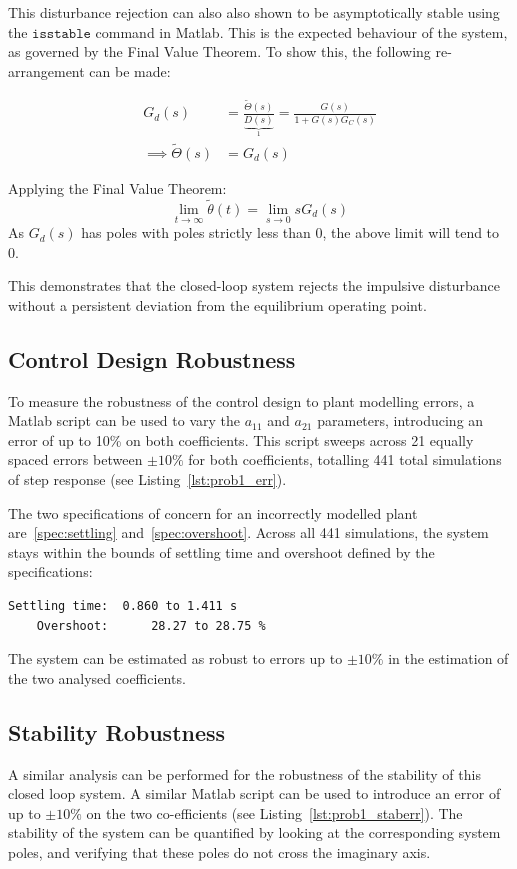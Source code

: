 \documentclass[conference,onecolumn,a4paper,11pt]{IEEEtran}
\begin{document}
This disturbance rejection can also also shown to be asymptotically stable using the $\texttt{isstable}$ command in Matlab. This is the expected behaviour of the system, as governed by the Final Value Theorem. To show this, the following re-arrangement can be made:

\begin{align*}
    G_d(s) &= \frac{\tilde{\Theta}(s)}{\underbrace{D(s)}_{1}} = \frac{G(s)}{1+G(s)G_C(s)} \\
    \implies \tilde{\Theta}(s) &= G_d(s)
\end{align*}

Applying the Final Value Theorem:
\[
    \lim_{t\to\infty}\tilde{\theta}(t) = \lim_{s\to0}sG_d(s)
\]
As $G_d(s)$ has poles with poles strictly less than 0, the above limit will tend to 0. 

This demonstrates that the closed-loop system rejects the impulsive disturbance without a persistent deviation from the equilibrium operating point.

\subsection{Control Design Robustness}
To measure the robustness of the control design to plant modelling errors, a Matlab script can be used to vary the $a_{11}$ and $a_{21}$ parameters, introducing an error of up to 10\% on both coefficients. This script sweeps across 21 equally spaced errors between $\pm10\%$ for both coefficients, totalling 441 total simulations of step response (see Listing~\ref{lst:prob1_err}). 

The two specifications of concern for an incorrectly modelled plant are~\ref{spec:settling} and~\ref{spec:overshoot}. Across all 441 simulations, the system stays within the bounds of settling time and overshoot defined by the specifications:
\par\noindent\begin{minipage}{\linewidth}
\begin{lstlisting}[style=outputstyle]
    Settling time:  0.860 to 1.411 s
    Overshoot:      28.27 to 28.75 % 
\end{lstlisting}
\end{minipage}\par
The system can be estimated as robust to errors up to $\pm10\%$ in the estimation of the two analysed coefficients.


\subsection{Stability Robustness}
A similar analysis can be performed for the robustness of the stability of this closed loop system. A similar Matlab script can be used to introduce an error of up to $\pm10\%$ on the two co-efficients (see Listing~\ref{lst:prob1_staberr}). The stability of the system can be quantified by looking at the corresponding system poles, and verifying that these poles do not cross the imaginary axis.
\end{document}
